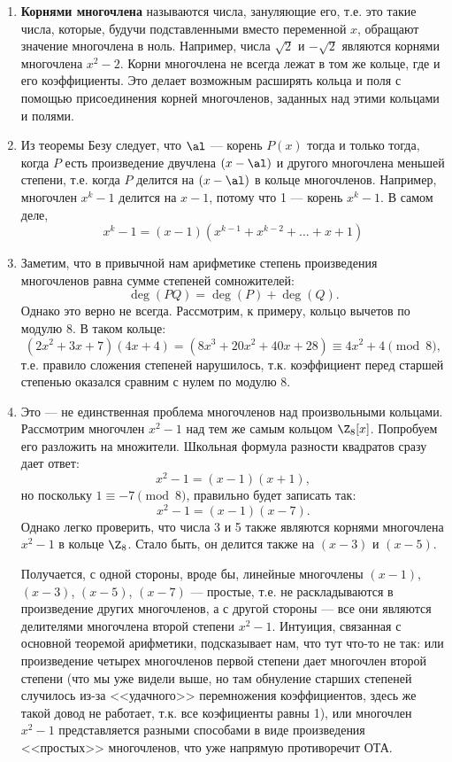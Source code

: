 \begin{enumerate}
\item \textbf{Корнями многочлена} называются числа, зануляющие его, т.е. это такие числа, которые, будучи подставленными вместо переменной $x$, обращают значение многочлена в ноль. Например, числа $\sqrt 2$ и $-\sqrt 2$ являются корнями многочлена $x^2-2$. Корни многочлена не всегда лежат в том же кольце, где и его коэффициенты. Это делает возможным расширять кольца и поля с помощью присоединения корней многочленов, заданных над этими кольцами и полями.
\item Из теоремы Безу следует, что $\al$ --- корень $P(x)$ тогда и только тогда, когда $P$ есть произведение двучлена $(x-\al)$ и другого многочлена меньшей степени, т.е. когда $P$ делится на $(x-\al)$ в кольце многочленов. Например, многочлен $x^k-1$ делится на $x-1$, потому что 1 --- корень $x^k-1$. В самом деле,
$$
x^k-1=(x-1)(x^{k-1}+x^{k-2}+\dots+x+1)
$$

\item Заметим, что в привычной нам арифметике степень произведения многочленов равна сумме степеней сомножителей:
$$
\deg(PQ)=\deg(P)+\deg(Q).
$$
Однако это верно не всегда. Рассмотрим, к примеру, кольцо вычетов по модулю $8$. В таком кольце:
$$
(2x^2+3x+7)(4x+4) = (8x^3+20x^2+40x+28) \equiv 4x^2+4\pmod 8,
$$
т.е. правило сложения степеней нарушилось, т.к. коэффициент перед старшей степенью оказался сравним с нулем по модулю $8$.
\item Это --- не единственная проблема многочленов над произвольными кольцами. Рассмотрим многочлен $x^2-1$ над тем же самым кольцом $\Z_8[x]$.
Попробуем его разложить на множители. Школьная формула разности квадратов сразу дает ответ:
$$
x^2-1=(x-1)(x+1),
$$
но поскольку $1\equiv -7\pmod 8$, правильно будет записать так:
$$
x^2-1=(x-1)(x-7).
$$
Однако легко проверить, что числа 3 и 5 также являются корнями многочлена $x^2-1$ в кольце $\Z_8$. Стало быть, он делится также на $(x-3)$ и $(x-5)$.

Получается, с одной стороны, вроде бы, линейные многочлены $(x-1)$, $(x-3)$, $(x-5)$, $(x-7)$ --- простые, т.е. не раскладываются в произведение других многочленов, а с другой стороны --- все они являются делителями многочлена второй степени $x^2-1$. Интуиция, связанная с основной теоремой арифметики, подсказывает нам, что тут что-то не так: или произведение четырех многочленов первой степени дает многочлен второй степени (что мы уже видели выше, но там обнуление старших степеней случилось из-за <<удачного>> перемножения коэффициентов, здесь же такой довод не работает, т.к. все коэфициенты равны 1), или многочлен $x^2-1$ представляется разными способами в виде произведения <<простых>> многочленов, что уже напрямую противоречит ОТА.


\end{enumerate}
